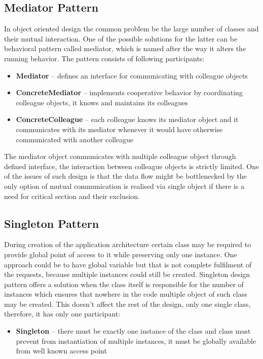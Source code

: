 \subsection{Mediator Pattern}
In object oriented design the common problem be the large number of classes and
their mutual interaction. One of the possible solutions for the latter can be
behavioral pattern called mediator, which is named after the way it alters the
running behavior. The pattern consists of following participants:

\begin{itemize}
\item \textbf{Mediator} -- defines an interface for communicating with colleague 
objects
\item \textbf{ConcreteMediator} -- implements cooperative behavior by coordinating
colleague objects, it knows and maintains its colleagues
\item \textbf{ConcreteColleague} -- each colleague knows its mediator object and
it communicates with its mediator whenever it would have otherwise communicated 
with another colleague
\end{itemize}

The mediator object communicates with multiple colleague object through defined
interface, the interaction between colleague objects is strictly limited.
One of the issues of such design is that the data flow might be bottlenecked by
the only option of mutual communication is realised via single object if there
is a need for critical section and their exclusion.

\subsection{Singleton Pattern}
During creation of the application architecture certain class may be required
to provide global point of access to it while preserving only one instance.
One approach could be to have global variable but that is not complete fulfilment
of the requests, because multiple instances could still be created.
Singleton design pattern offers a solution when the class itself is responsible
for the number of instances which ensures that nowhere in the code multiple object
of such class may be created. This doesn't affect the rest of the design, only
one single class, therefore, it has only one participant:

\begin{itemize}
\item \textbf{Singleton} -- there must be exactly one instance of the class and
class must prevent from instantiation of multiple instances,  it must be 
globally available from well known access point
\end{itemize}

